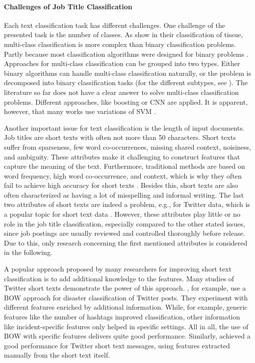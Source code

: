 \documentclass[12pt, a4paper, titlepage]{article}
\begin{document}
\paragraph{Challenges of Job Title Classification}
Each text classification task has different challenges. One challenge of the presented task is the number of classes. As \cite{li2004} show in their classification of tissue, multi-class classification is more complex than binary classification problems. Partly because most classification algorithms were designed for binary problems \citep{aly2005}. Approaches for multi-class classification can be grouped into two types. Either binary algorithms can handle multi-class classification naturally, or the problem is decomposed into binary classification tasks (for the different subtypes, see \cite{aly2005}). The literature so far does not have a clear answer to solve multi-class classification problems. Different approaches, like boosting \citep{schapire2000} or \ac{CNN} \citep{farooq2017} are applied. It is apparent, however, that many works use variations of SVM \citep{guo2015, tomar2015comparison, Tang2019}.  

Another important issue for text classification is the length of input documents. Job titles are short texts with often not more than 50 characters. Short texts suffer from sparseness, few word co-occurrences, missing shared context, noisiness, and ambiguity. These attributes make it challenging to construct features that capture the meaning of the text. Furthermore, traditional methods are based on word frequency, high word co-occurrence, and context, which is why they often fail to achieve high accuracy for short texts \citep{Song2014, WangY2017, WangF2014,  alsmadi2019}. Besides this, short texts are also often characterized as having a lot of misspelling and informal writing. The last two attributes of short texts are indeed a problem, e.g., for Twitter data, which is a popular topic for short text data \citep{karimi2013, sriram2010, yan2018}. However, these attributes play little or no role in the job title classification, especially compared to the other stated issues, since job postings are usually reviewed and controlled thoroughly before release. Due to this, only research concerning the first mentioned attributes is considered in the following. 

A popular approach proposed by many researchers for improving short text classification is to add additional knowledge to the features. Many studies of Twitter short texts demonstrate the power of this approach. \citet{karimi2013}, for example, use a \ac{BOW} approach for disaster classification of Twitter posts. They experiment with different features enriched by additional information. While, for example, generic features like the number of hashtags improved classification, other information like incident-specific features only helped in specific settings. All in all, the use of \ac{BOW} with specific features delivers quite good performance. Similarly, \citet{sriram2010} achieved a good performance for Twitter short text messages, using features extracted manually from the short text itself.
\end{document}
